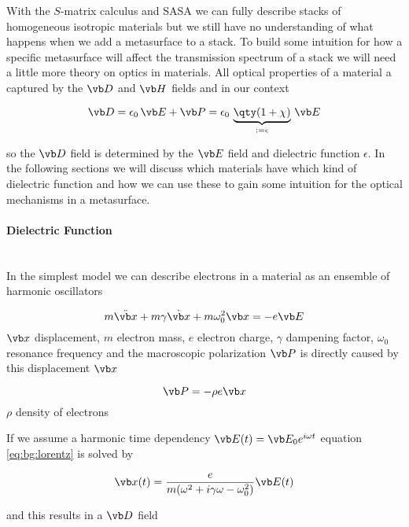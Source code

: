 With the $S$-matrix calculus and SASA we can fully describe stacks of homogeneous isotropic materials but we still have no understanding of what happens when we add a metasurface to a stack. To build some intuition for how a specific metasurface will affect the transmission spectrum of a stack we will need a little more theory on optics in materials. All optical properties of a material a captured by the $\vb D$ and $\vb H$ fields and in our context

\begin{equation}
    \vb D = 
    \epsilon_0 \, \vb E + \vb P =
    \epsilon_0\, \underbrace{\qty(1 + \chi)}_{
         := \epsilon
    }\, \vb E
\end{equation}

so the $\vb D$ field is determined by the $\vb E$ field and dielectric function $\epsilon$. In the following sections we will discuss which materials have which kind of dielectric function and how we can use these to gain some intuition for the optical mechanisms in a metasurface.

\paragraph{Dielectric Function}~\\
In the simplest model we can describe electrons in a material as an ensemble of harmonic oscillators

\begin{equation} \label{eq:bg:lorentz}
    m \ddot{\vb x} + m \gamma \dot{\vb x} + m \omega_0^2 \vb x = -e \vb E
\end{equation}
\indent
$\vb x$ displacement, $m$ electron mass, $e$ electron charge, $\gamma$ dampening factor, $\omega_0$ resonance frequency 
and the macroscopic polarization $\vb P$ is directly caused by this displacement $\vb x$

\begin{equation}
    \vb P = - \rho e \vb x
\end{equation}
\indent
$\rho$ density of electrons

If we assume a harmonic time dependency $\vb E(t) = \vb E_0 e^{i \omega t}$ equation \eqref{eq:bg:lorentz} is solved by 

\begin{equation}
    \vb x(t) = \frac{e}{m(\omega^2 + i \gamma \omega - \omega_0^2)} \vb E(t)
\end{equation}

and this results in a $\vb D$ field

